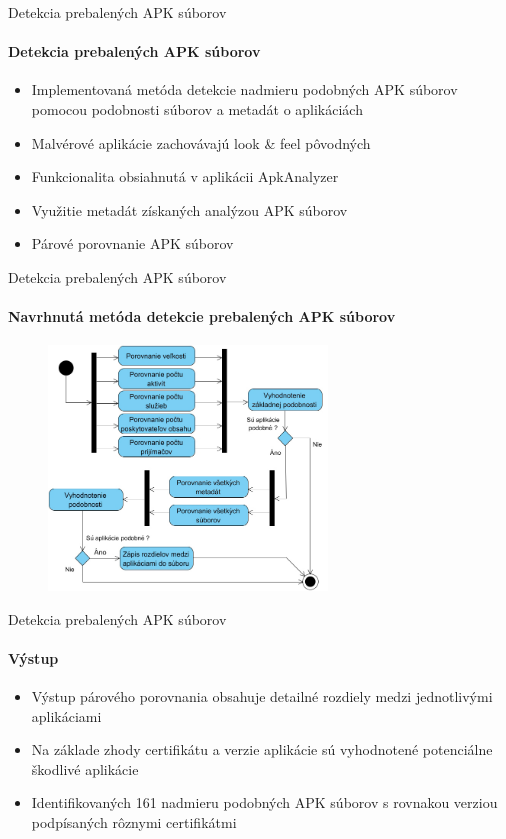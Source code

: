 \documentclass{beamer}
\begin{document}
  \begin{frame}[label=lists]{Detekcia prebalených APK súborov}
 	 \framesubtitle{Detekcia prebalených APK súborov}
	\begin{itemize}
	 	\item Implementovaná metóda detekcie nadmieru podobných APK súborov pomocou podobnosti súborov a metadát o aplikáciách
	 	\item Malvérové aplikácie zachovávajú look \& feel pôvodných
	 	\item Funkcionalita obsiahnutá v aplikácii ApkAnalyzer
	 	\item Využitie metadát získaných analýzou APK súborov
	 	\item Párové porovnanie APK súborov
	\end{itemize}
  \end{frame} 

    \begin{frame}[label=lists]{Detekcia prebalených APK súborov}
 	 \framesubtitle{Navrhnutá metóda detekcie prebalených APK súborov}
	\begin{figure}[htb]
  \begin{center}
    \includegraphics[height=6.5cm]{images/diagram.jpg}
  \end{center}
\end{figure}
  \end{frame} 

  \begin{frame}[label=lists]{Detekcia prebalených APK súborov}
   \framesubtitle{Výstup}
	\begin{itemize}
	\item Výstup párového porovnania obsahuje detailné rozdiely medzi jednotlivými aplikáciami
	\item Na základe zhody certifikátu a verzie aplikácie sú vyhodnotené potenciálne škodlivé aplikácie
	\item Identifikovaných 161 nadmieru podobných APK súborov s rovnakou verziou podpísaných rôznymi certifikátmi
	\end{itemize}
	\end{frame}
\end{document}
